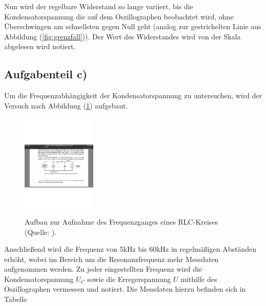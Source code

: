 \noindent
Nun wird der regelbare Widerstand so lange variiert,
bis die Kondensatorspannung die auf dem Oszillographen beobachtet wird,
ohne Überschwingen am schnellsten gegen Null geht 
(analog zur gestrichelten Linie aus Abbildung (\ref{fig:grenzfall})).
Der Wert des Widerstandes wird von der Skala abgelesen wird notiert.

\subsection{Aufgabenteil c)}
Um die Frequenzabhängigkeit der Kondensatorspannung zu untersuchen, 
wird der Versuch nach Abbildung (\ref{fig:aufbauc}) aufgebaut.

\begin{figure}
    \centering
       \includegraphics[height=5cm]{aufbauc.pdf}
       \caption{Aufbau zur Aufnahme des Frequenzganges eines RLC-Kreises (Quelle: \cite{V354}).}
       \label{fig:aufbauc}
\end{figure}

\noindent
Anschließend wird die Frequenz von 5kHz bis 60kHz in regelmäßigen Abständen erhöht, 
wobei im Bereich um die Resonanzfrequenz mehr Messdaten aufgenommen werden.
Zu jeder eingestellten Frequenz wird die Kondensatorspannung $U_C$ sowie die Erregerspannung $U$ mithilfe des Oszillographen vermessen
und notiert.
Die Messdaten hierzu befinden sich in Tabelle %

